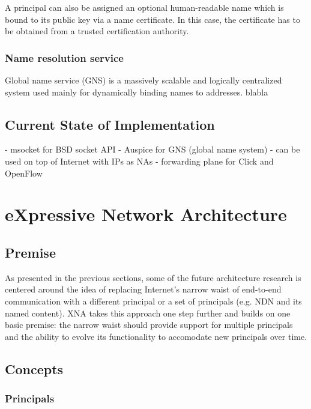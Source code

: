             A principal can also be assigned an optional human-readable name which is bound to its public key via a name certificate. In this case, the certificate has to be obtained from a trusted certification authority.


            \subsubsection{Name resolution service}

            Global name service (GNS) is a massively scalable and logically centralized system used mainly for dynamically binding names to addresses. blabla


        \subsection{Current State of Implementation}
            - msocket for BSD socket API
            - Auspice for GNS (global name system)
            - can be used on top of Internet with IPs as NAs
            - forwarding plane for Click and OpenFlow


    \section{eXpressive Network Architecture}

        \subsection{Premise}
            As presented in the previous sections, some of the future architecture research is centered around the idea of replacing Internet's narrow waist of end-to-end communication with a different principal or a set of principals (e.g. NDN and its named content). XNA takes this approach one step further and builds on one basic premise: the narrow waist should provide support for multiple principals and the ability to evolve its functionality to accomodate new principals over time.

        \subsection{Concepts}

            \subsubsection{Principals}

